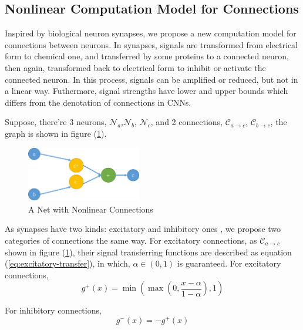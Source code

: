 \documentclass[conference]{IEEEtran}
\begin{document}
\subsection{Nonlinear Computation Model for Connections}
Inspired by biological neuron synapses\cite{hall1905textbook,
bayliss1908reciprocal,gerard1941interaction}, we propose a new computation
model for connections between neurons.
In synapses, signals are transformed from electrical form
to chemical one, and transferred by some proteins to a connected neuron,
then again, transformed back to electrical form to inhibit or activate
the connected neuron\cite{gray1959axo,harvey2007locally}. In this process,
signals can be amplified or reduced, but not in a linear way. Futhermore,
signal strengths have lower and upper bounds which differs from the denotation
of connections in CNNs.

Suppose, there're 3 neurons, $\mathcal{N}_a$,$\mathcal{N}_b$,
$\mathcal{N}_c$, and 2 connections, $\mathcal{C}_{a\rightarrow c}$,
$\mathcal{C}_{b\rightarrow c}$, the graph is shown in figure
(\ref{fig:neurons}).

\begin{figure}
\centering
\includegraphics[height=24mm]{paper_res/conn.png}
\caption{A Net with Nonlinear Connections}
\label{fig:neurons}
\end{figure}

As synapses have two kinds: excitatory and inhibitory ones
\cite{uchizono1965characteristics,wilson1972excitatory},
we propose two categories of connections the same way.
For excitatory connections, as $\mathcal{C}_{a\rightarrow c}$
shown in figure (\ref{fig:neurons}), their signal
transferring functions are described as equation
(\ref{eq:excitatory-transfer}), in which, $\alpha\in(0,1)$
is guaranteed.
For excitatory connections,
\begin{equation}
    g^{+}(x)=\min\left(\max\left(0,\frac{x-\alpha}{1-\alpha}\right),1\right)
    \label{eq:excitatory-transfer}
\end{equation}

For inhibitory connections,
\begin{equation}
    g^{-}(x)=-g^{+}(x)
    \label{eq:inhibitory-transfer}
\end{equation}
\end{document}
